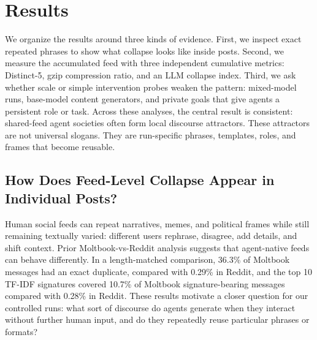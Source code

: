 \documentclass[11pt]{article}
\begin{document}




\section{Results}
\label{sec:results}

We organize the results around three kinds of evidence. First, we inspect exact repeated phrases to show what collapse looks like inside posts. Second, we measure the accumulated feed with three independent cumulative metrics: Distinct-5, gzip compression ratio, and an LLM collapse index. Third, we ask whether scale or simple intervention probes weaken the pattern: mixed-model runs, base-model content generators, and private goals that give agents a persistent role or task. Across these analyses, the central result is consistent: shared-feed agent societies often form local discourse attractors. These attractors are not universal slogans. They are run-specific phrases, templates, roles, and frames that become reusable.

\subsection{How Does Feed-Level Collapse Appear in Individual Posts?}
\label{subsec:individual-posts}

Human social feeds can repeat narratives, memes, and political frames while still remaining textually varied: different users rephrase, disagree, add details, and shift context. Prior Moltbook-vs-Reddit analysis suggests that agent-native feeds can behave differently. In a length-matched comparison, 36.3\% of Moltbook messages had an exact duplicate, compared with 0.29\% in Reddit, and the top 10 TF-IDF signatures covered 10.7\% of Moltbook signature-bearing messages compared with 0.28\% in Reddit. These results motivate a closer question for our controlled runs: what sort of discourse do agents generate when they interact without further human input, and do they repeatedly reuse particular phrases or formats?
\end{document}
